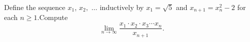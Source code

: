 \documentclass{article}
\begin{document}
\setlength{\parindent}{0pt}
Define the sequence $x_{1}$, $x_{2},$ $\dots$ inductively by $x_{1}=\sqrt{5}$ and $x_{n+1}=x_{n}^{2}-2$ for each $n\ge1$.\newline Compute$$\lim_{n\to\infty}\frac{x_{1}\cdot x_{2}\cdot x_{3}\cdots x_{n}}{x_{n+1}}.$$
\end{document}
